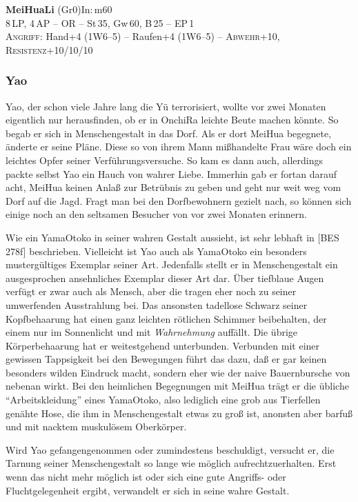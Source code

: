 \documentclass[
a4paper,
twoside,
DIV=calc,
BCOR=4mm,
fontsize=9pt,
twocolumn=on,
titlepage=on,
parskip=half
]{scrartcl}
\begin{document}
\textbf{MeiHuaLi} (Gr0)\hfill In:\,m60\\
8\,LP, 4\,AP -- OR -- St\,35, Gw\,60, B\,25 -- EP\,1\\
\textsc{Angriff:} Hand+4 (1W6--5) -- Raufen+4 (1W6--5) -- \textsc{Abwehr}+10,
\textsc{Resistenz}+10/10/10

\subsubsection{Yao}
\label{yao}

Yao, der schon viele Jahre lang die Yü terrorisiert, wollte vor zwei
Monaten eigentlich nur herausfinden, ob er in OnchiRa leichte Beute
machen könnte. So begab er sich in Menschengestalt in das Dorf. Als er
dort MeiHua begegnete, änderte er seine Pläne. Diese so von ihrem Mann
mißhandelte Frau wäre doch ein leichtes Opfer seiner
Verführungsversuche. So kam es dann auch, allerdings packte selbst Yao
ein Hauch von wahrer Liebe. Immerhin gab er fortan darauf acht, MeiHua
keinen Anlaß zur Betrübnis zu geben und geht nur weit weg vom Dorf auf
die Jagd. Fragt man bei den Dorfbewohnern gezielt nach, so können sich
einige noch an den seltsamen Besucher von vor zwei Monaten erinnern.

Wie ein YamaOtoko in seiner wahren Gestalt aussieht, ist sehr lebhaft
in [BES\,278f] beschrieben. Vielleicht ist Yao auch als YamaOtoko ein
besonders mustergültiges Exemplar seiner Art. Jedenfalls stellt er in
Menschengestalt ein ausgesprochen ansehnliches Exemplar dieser Art
dar. Über tiefblaue Augen verfügt er zwar auch als Mensch, aber die
tragen eher noch zu seiner umwerfenden Ausstrahlung bei. Das ansonsten
tadellose Schwarz seiner Kopfbehaarung hat einen ganz leichten
rötlichen Schimmer beibehalten, der einem nur im Sonnenlicht und mit
\emph{Wahrnehmung} auffällt. Die übrige Körperbehaarung hat er
weitestgehend unterbunden. Verbunden mit einer gewissen Tappsigkeit
bei den Bewegungen führt das dazu, daß er gar keinen besonders wilden
Eindruck macht, sondern eher wie der naive Bauernbursche von nebenan
wirkt. Bei den heimlichen Begegnungen mit MeiHua trägt er die übliche
"`Arbeitskleidung"' eines YamaOtoko, also lediglich eine grob aus
Tierfellen genähte Hose, die ihm in Menschengestalt etwas zu groß ist,
anonsten aber barfuß und mit nacktem muskulösem Oberkörper.

Wird Yao gefangengenommen oder zumindestens beschuldigt, versucht er,
die Tarnung seiner Menschengestalt so lange wie möglich
aufrechtzuerhalten. Erst wenn das nicht mehr möglich ist oder sich
eine gute Angriffs- oder Fluchtgelegenheit ergibt, verwandelt er sich
in seine wahre Gestalt.
\end{document}
